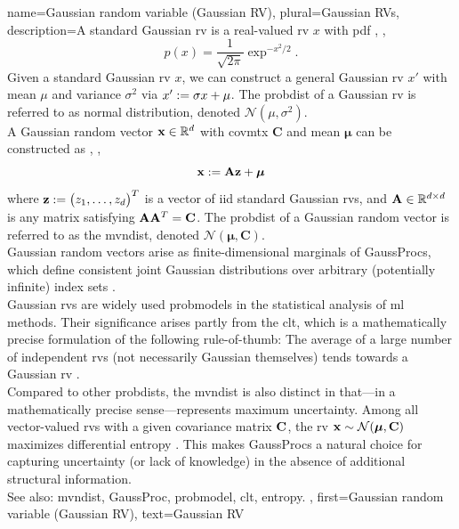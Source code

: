{name={Gaussian random variable (Gaussian RV)}, 
	plural={Gaussian RVs}, 
	description={A  standard Gaussian \gls{rv} is a 
		real-valued \gls{rv} $x$ with \gls{pdf} \cite{BertsekasProb}, \cite{GrayProbBook}, \cite{papoulis}
		\begin{equation}
			\nonumber
			p(x) = \frac{1}{\sqrt{2\pi}} \exp^{-x^2/2}. 
		\end{equation}
		Given a standard Gaussian \gls{rv} $x$, we can construct a general Gaussian \gls{rv} $x'$ with 
		\gls{mean} $\mu$ and \gls{variance} $\sigma^2$ via $x' := \sigma x + \mu$. The \gls{probdist} of a 
		Gaussian \gls{rv} is referred to as normal distribution, denoted $\mathcal{N}(\mu, \sigma^2)$. 
		\\ 
		A Gaussian random vector ${\bf x} \in \mathbb{R}^{d}$ with 
		\gls{covmtx} $\mathbf{C}$ and \gls{mean} ${\bm \mu}$ can be constructed as \cite{GrayProbBook}, \cite{papoulis}, \cite{Lapidoth09}
		\[
		{\bf x} := \mathbf{A} {\bf z} + {\bm \mu}
		\]
		where ${\bf z} := \big( z_{1}, \ldots, z_{d} \big)^{T}$ is a vector of \gls{iid} standard Gaussian \glspl{rv}, 
		and ${\bf A} \in \mathbb{R}^{d \times d}$ is any matrix satisfying ${\bf A} {\bf A}^{T} = {\bf C}$. 
		The \gls{probdist} of a 
		Gaussian random vector is referred to as the \gls{mvndist}, denoted $\mathcal{N}({\bm \mu}, \mathbf{C})$.
		\\
		Gaussian random vectors arise as finite-dimensional marginals of \glspl{GaussProc}, which define 
		consistent joint Gaussian distributions over arbitrary (potentially infinite) index sets \cite{Rasmussen2006Gaussian}. 
  		\\
        		Gaussian \glspl{rv} are widely used \glspl{probmodel} in the statistical analysis of 
        		\gls{ml} methods. Their significance arises partly from the \gls{clt}, which is a mathematically 
        		precise formulation of the following rule-of-thumb: The average of a large number of 
        		independent \glspl{rv} (not necessarily Gaussian themselves) tends towards a Gaussian \gls{rv} \cite{ross2013first}.
		\\ 
		Compared to other \glspl{probdist}, the \gls{mvndist} is also distinct in that—in a mathematically 
		precise sense—represents maximum \gls{uncertainty}. Among all vector-valued \glspl{rv} with 
		a given covariance matrix ${\bf C}$, the \gls{rv} ${\bf x} \sim \mathcal{N}({\bm \mu}, \mathbf{C})$ 
		maximizes differential \gls{entropy} \cite[Th. 8.6.5]{coverthomas}. This makes \glspl{GaussProc} 
		a natural choice for capturing \gls{uncertainty} (or lack of knowledge) in the absence of additional 
		structural information.
		\\ 
		See also: \gls{mvndist}, \gls{GaussProc}, \gls{probmodel}, \gls{clt}, \gls{entropy}.
	},
	first={Gaussian random variable (Gaussian RV)},
	text={Gaussian RV}
}
	
